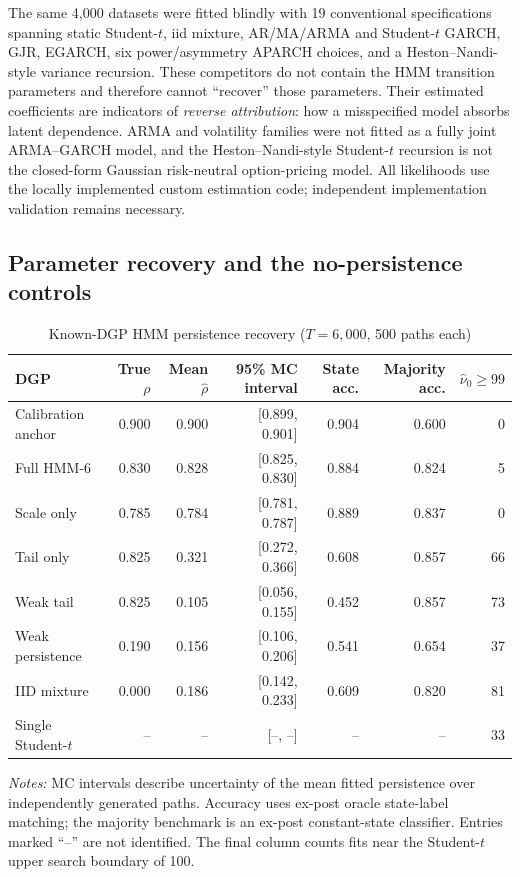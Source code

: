 \documentclass[11pt,a4paper]{article}
\begin{document}
The same 4,000 datasets were fitted blindly with 19 conventional specifications spanning static Student-$t$, iid mixture, AR/MA/ARMA and Student-$t$ GARCH, GJR, EGARCH, six power/asymmetry APARCH choices, and a Heston--Nandi-style variance recursion. These competitors do not contain the HMM transition parameters and therefore cannot ``recover'' those parameters. Their estimated coefficients are indicators of \emph{reverse attribution}: how a misspecified model absorbs latent dependence. ARMA and volatility families were not fitted as a fully joint ARMA--GARCH model, and the Heston--Nandi-style Student-$t$ recursion is not the closed-form Gaussian risk-neutral option-pricing model. All likelihoods use the locally implemented custom estimation code; independent implementation validation remains necessary.

\subsection{Parameter recovery and the no-persistence controls}
\begin{table}[htbp]\centering\footnotesize
\caption{Known-DGP HMM persistence recovery ($T=6{,}000$, 500 paths each)}\label{tab:dgp_recovery}
\setlength{\tabcolsep}{3.8pt}
\begin{tabular}{lrrrrrr}\toprule
DGP & True $\rho$ & Mean $\hat\rho$ & 95\% MC interval & State acc. & Majority acc. & $\hat\nu_0\ge99$ \\\midrule
Calibration anchor & 0.900 & 0.900 & [0.899, 0.901] & 0.904 & 0.600 & 0 \\ 
Full HMM-6 & 0.830 & 0.828 & [0.825, 0.830] & 0.884 & 0.824 & 5 \\ 
Scale only & 0.785 & 0.784 & [0.781, 0.787] & 0.889 & 0.837 & 0 \\ 
Tail only & 0.825 & 0.321 & [0.272, 0.366] & 0.608 & 0.857 & 66 \\ 
Weak tail & 0.825 & 0.105 & [0.056, 0.155] & 0.452 & 0.857 & 73 \\ 
Weak persistence & 0.190 & 0.156 & [0.106, 0.206] & 0.541 & 0.654 & 37 \\ 
IID mixture & 0.000 & 0.186 & [0.142, 0.233] & 0.609 & 0.820 & 81 \\ 
Single Student-$t$ & -- & -- & [--, --] & -- & -- & 33 \\ 
\bottomrule\end{tabular}
\par\vspace{2pt}\scriptsize\emph{Notes:} MC intervals describe uncertainty of the mean fitted persistence over independently generated paths. Accuracy uses ex-post oracle state-label matching; the majority benchmark is an ex-post constant-state classifier. Entries marked ``--'' are not identified. The final column counts fits near the Student-$t$ upper search boundary of 100.
\end{table}
\end{document}
